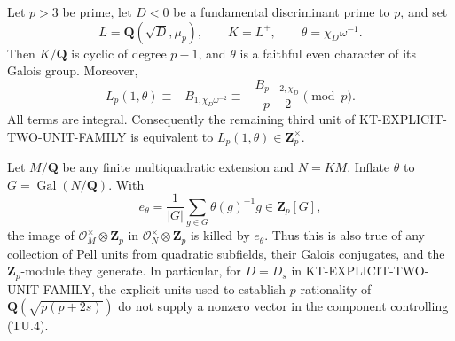 \begin{theorem}
Let $p>3$ be prime, let $D<0$ be a fundamental discriminant prime
to $p$, and set
\[
 L=\mathbf Q(\sqrt D,\mu_p),\qquad K=L^+,
 \qquad\theta=\chi_D\omega^{-1}.                          \tag{TU.3}
\]
Then $K/\mathbf Q$ is cyclic of degree $p-1$, and $\theta$ is a
faithful even character of its Galois group.  Moreover,
\[
 L_p(1,\theta)\equiv-B_{1,\chi_D\omega^{-2}}
       \equiv-\frac{B_{p-2,\chi_D}}{p-2}\pmod p.           \tag{TU.4}
\]
All terms are integral.  Consequently the remaining third unit of
KT-EXPLICIT-TWO-UNIT-FAMILY is equivalent to
$L_p(1,\theta)\in\mathbf Z_p^\times$.

Let $M/\mathbf Q$ be any finite multiquadratic extension and
$N=KM$.  Inflate $\theta$ to $G=\operatorname{Gal}(N/\mathbf Q)$.
With
\[
 e_\theta=\frac1{|G|}\sum_{g\in G}\theta(g)^{-1}g
          \in\mathbf Z_p[G],                              \tag{TU.5}
\]
the image of $\mathcal O_M^\times\otimes\mathbf Z_p$ in
$\mathcal O_N^\times\otimes\mathbf Z_p$ is killed by
$e_\theta$.  Thus this is also true of any collection of Pell
units from quadratic subfields, their Galois conjugates, and the
$\mathbf Z_p$-module they generate.  In particular, for $D=D_s$
in KT-EXPLICIT-TWO-UNIT-FAMILY, the explicit units used to
establish $p$-rationality of
$\mathbf Q(\sqrt{p(p+2s)})$ do not supply a nonzero vector in
the component controlling (TU.4).
\end{theorem}
